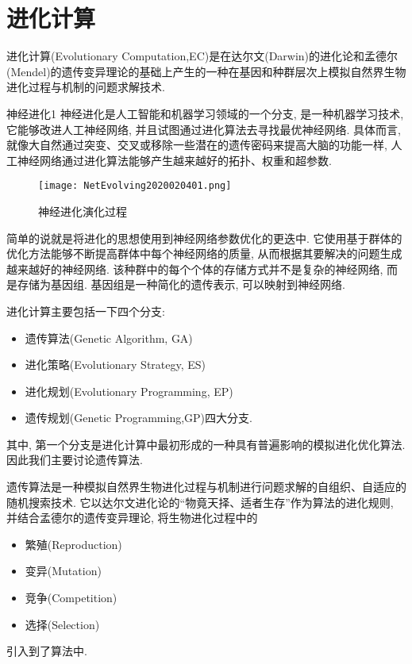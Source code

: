 \section{进化计算}
进化计算(Evolutionary Computation,EC)是在达尔文(Darwin)的进化论和孟德尔(Mendel)的遗传变异理论的基础上产生的一种在基因和种群层次上模拟自然界生物进化过程与机制的问题求解技术.
\begin{mydef}{神经进化}{1}
    神经进化是人工智能和机器学习领域的一个分支, 是一种机器学习技术, 它能够改进人工神经网络, 并且试图通过进化算法去寻找最优神经网络.
    具体而言, 就像大自然通过突变、交叉或移除一些潜在的遗传密码来提高大脑的功能一样, 人工神经网络通过进化算法能够产生越来越好的拓扑、权重和超参数.
\end{mydef}
\begin{figure}[H]
\centering
\texttt{[image: NetEvolving2020020401.png]}
\caption{神经进化演化过程}
\label{NetEvolving2020020401}
\end{figure}
简单的说就是将进化的思想使用到神经网络参数优化的更迭中. 它使用基于群体的优化方法能够不断提高群体中每个神经网络的质量, 从而根据其要解决的问题生成越来越好的神经网络.
该种群中的每个个体的存储方式并不是复杂的神经网络, 而是存储为基因组. 基因组是一种简化的遗传表示, 可以映射到神经网络.

进化计算主要包括一下四个分支:
\begin{itemize}
\item 遗传算法(Genetic Algorithm, GA)
\item 进化策略(Evolutionary Strategy, ES)
\item 进化规划(Evolutionary Programming, EP)
\item 遗传规划(Genetic Programming,GP)四大分支.
\end{itemize}
其中, 第一个分支是进化计算中最初形成的一种具有普遍影响的模拟进化优化算法. 因此我们主要讨论遗传算法.

遗传算法是一种模拟自然界生物进化过程与机制进行问题求解的自组织、自适应的随机搜索技术. 它以达尔文进化论的“物竟天择、适者生存”作为算法的进化规则, 并结合孟德尔的遗传变异理论, 将生物进化过程中的
\begin{itemize}
\item 繁殖(Reproduction)
\item 变异(Mutation)
\item 竞争(Competition)
\item 选择(Selection)
\end{itemize}
引入到了算法中.

